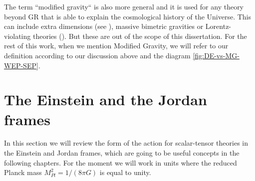The term ``modified gravity`` is also more general and it is used for
any theory beyond GR that is able to explain the cosmological history
of the Universe. This can include extra dimensions (see \cite{DGP}),
massive bimetric gravities \cite{cite bimetric stuff} or Lorentz-violating theories
(\cite{cite some by Blas, et al}). But these are out of the scope of this dissertation. 
For the rest of this work, when we mention Modified Gravity, we will refer to our definition according
to our discussion above and the diagram \ref{fig:DE-vs-MG-WEP-SEP}.

%
 
\section{The Einstein and the Jordan frames \label{sec:Einstein-Jordan}}

In this section we will review the form of the action for scalar-tensor theories in the Einstein and Jordan frames,
which are going to be useful concepts in the following chapters. For the moment we will work in units where the reduced Planck mass
$M_{Pl}^{2} = 1/(8 \pi G)$ is equal to unity.


